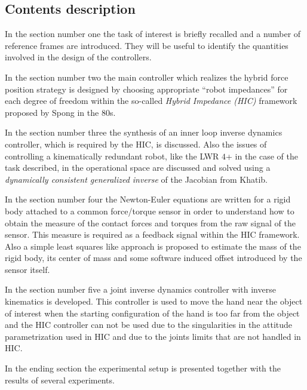 \subsection*{Contents description}
In the section number one the task of interest is briefly recalled
and a number of reference frames are introduced. They will be useful
to identify the quantities involved in the design of the controllers.
\par
In the section number two the main controller which realizes the hybrid
force position strategy is designed by choosing appropriate ``robot impedances''
for each degree of freedom within the so-called \emph{Hybrid Impedance (HIC)} framework
proposed by Spong in the 80s.
\par
In the section number three the synthesis of an inner loop inverse dynamics
controller, which is required by the HIC, is discussed. Also the issues of
controlling a kinematically redundant robot, like the LWR $4$+ in the case
of the task described, in the operational space
are discussed and solved using a \emph{dynamically consistent
generalized inverse} of the Jacobian from Khatib.
\par
In the section number four the Newton-Euler equations are written for
a rigid body attached to a common force/torque sensor in order to understand
how to obtain the measure of the contact forces and torques from the raw
signal of the sensor. This measure is required as a feedback signal within the
HIC framework. Also a simple least squares like approach is proposed
to estimate the mass of the rigid body, its center of mass and some software
induced offset introduced by the sensor itself.
\par
In the section number five a joint inverse dynamics controller with inverse
kinematics is developed. This controller is used to move the hand near
the object of interest when the starting configuration of the hand
is too far from the object and the HIC controller can not be used due
to the singularities in the attitude parametrization used in HIC
and due to the joints limits that are not handled in HIC.

\par
In the ending section the experimental setup is presented together with
the results of several experiments.
\newpage
